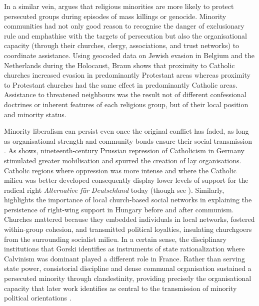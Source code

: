 \documentclass[12pt]{article}
\begin{document}
In a similar vein, \textcite{braunReligiousMinoritiesResistance2016, braunProtectorsPluralismReligious2019} argues that religious minorities are more likely to protect persecuted groups during episodes of mass killings or genocide. Minority communities had not only good reason to recognise the danger of exclusionary rule and emphathise with the targets of persecution but also the organisational capacity (through their churches, clergy, associations, and trust networks) to coordinate assistance. Using geocoded data on Jewish evasion in Belgium and the Netherlands during the Holocaust, Braun shows that proximity to Catholic churches increased evasion in predominantly Protestant areas whereas proximity to Protestant churches had the same effect in predominantly Catholic areas. Assistance to threatened neighbours was the result not of different confessional doctrines or inherent features of each religious group, but of their local position and minority status.

Minority liberalism can persist even once the original conflict has faded, as long as organisational strength and community bonds ensure their social transmission \parencite{charnyshRoleCommunitiesTransmission2022, cremaschiPoliticalLegaciesWartime2025}. As \textcite{haffertLongTermEffectsOppression2021} shows, nineteenth-century Prussian repression of Catholicism in Germany stimulated greater mobilisation and spurred the creation of lay organisations. Catholic regions where oppression was more intense and where the Catholic milieu was better developed consequently display lower levels of support for the radical right \textit{Alternative für Deutschland} today (though see \cite{arzheimerOppressionCatholicsPrussia2024, manowErbeKulturkampfsOder2023}). Similarly, \textcite{wittenbergCruciblesPoliticalLoyalty2006} highlights the importance of local church-based social networks in explaining the persistence of right-wing support in Hungary before and after communism. Churches mattered because they embedded individuals in local networks, fostered within-group cohesion, and transmitted political loyalties, insulating churchgoers from the surrounding socialist milieu. In a certain sense, the disciplinary institutions that Gorski \parencite*{gorskiDisciplinaryRevolutionCalvinism2003} identifies as instruments of state rationalization where Calvinism was dominant played a different role in France. Rather than serving state power, consistorial discipline and dense communal organisation sustained a persecuted minority through clandestinity, providing precisely the organisational capacity that later work identifies as central to the transmission of minority political orientations \parencite{braunProtectorsPluralismReligious2019, charnyshRoleCommunitiesTransmission2022}.
\end{document}
